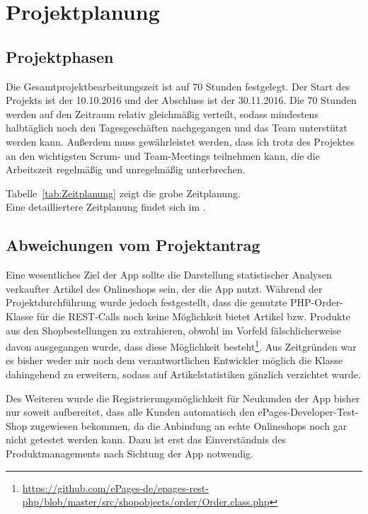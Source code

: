\section{Projektplanung} 
\label{sec:Projektplanung}


\subsection{Projektphasen}
\label{sec:Projektphasen}

Die Gesamtprojektbearbeitungszeit ist auf 70 Stunden festgelegt. Der Start des Projekts ist der 10.10.2016 und der Abschluss ist der 30.11.2016. Die 70 Stunden werden auf den Zeitraum relativ gleichmäßig verteilt, sodass mindestens halbtäglich noch den Tagesgeschäften nachgegangen und das Team unterstützt werden kann. Außerdem muss gewährleistet werden, dass ich trotz des Projektes an den wichtigsten Scrum- und Team-Meetings teilnehmen kann, die die Arbeitszeit regelmäßig und unregelmäßig unterbrechen.

Tabelle~\ref{tab:Zeitplanung} zeigt die grobe Zeitplanung.
\\
Eine detailliertere Zeitplanung findet sich im .


\subsection{Abweichungen vom Projektantrag}
\label{sec:AbweichungenProjektantrag}

Eine wesentliches Ziel der App sollte die Darstellung statistischer Analysen verkaufter Artikel des Onlineshops sein, der die App nutzt. Während der Projektdurchführung wurde jedoch festgestellt, dass die genutzte PHP-Order-Klasse für die REST-Calls noch keine Möglichkeit bietet Artikel bzw. Produkte aus den Shopbestellungen zu extrahieren, obwohl im Vorfeld fälschlicherweise davon ausgegangen wurde, dass diese Möglichkeit besteht\footnote{\url{https://github.com/ePages-de/epages-rest-php/blob/master/src/shopobjects/order/Order.class.php}}. Aus Zeitgründen war es bisher weder mir noch dem verantwortlichen Entwickler möglich die Klasse dahingehend zu erweitern, sodass auf Artikelstatistiken gänzlich verzichtet wurde. 

Des Weiteren wurde die Registrierungsmöglichkeit für Neukunden der App bisher nur soweit aufbereitet, dass alle Kunden automatisch den ePages-Developer-Test-Shop zugewiesen bekommen, da die Anbindung an echte Onlineshops noch gar nicht getestet werden kann. Dazu ist erst das Einverständnis des Produktmanagements nach Sichtung der App notwendig.

